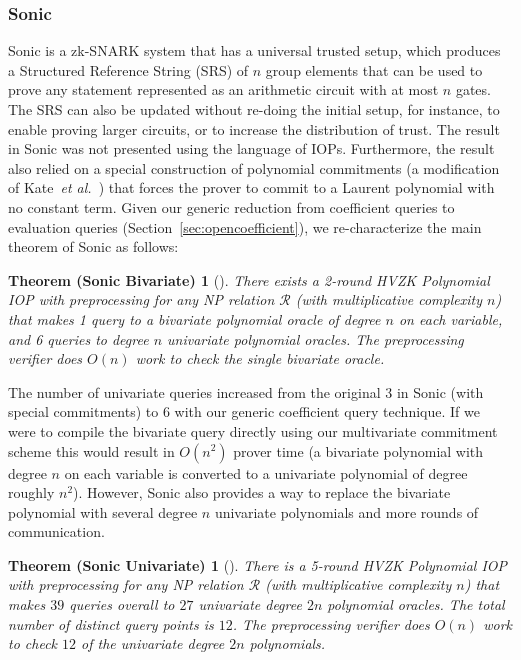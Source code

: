\subsubsection{Sonic} 
\textsf{Sonic} is a zk-SNARK system that has a universal trusted setup, which produces a Structured Reference String (SRS) of $n$ group elements that can be used to prove any statement represented as an arithmetic circuit with at most $n$ gates. The SRS can also be updated without re-doing the initial setup, for instance, to enable proving larger circuits, or to increase the distribution of trust. The result in \textsf{Sonic} was not presented using the language of IOPs. Furthermore, the result also relied on a special construction of polynomial commitments (a modification of Kate~\emph{et al.}~\cite{AC:KatZavGol10}) that forces the prover to commit to a Laurent polynomial with no constant term. Given our generic reduction from coefficient queries to evaluation queries (Section~\ref{sec:opencoefficient}), we re-characterize the main theorem of \textsf{Sonic} as follows: 
\newtheorem*{sonictheorem}{Theorem (Sonic Bivariate)}
\begin{sonictheorem}[\cite{Sonic}]
There exists a 2-round HVZK Polynomial IOP with preprocessing for any NP relation $\mathcal{R}$ (with multiplicative complexity $n$) that makes 1 query to a bivariate polynomial oracle of degree $n$ on each variable, and 6 queries to degree $n$ univariate polynomial oracles. The preprocessing verifier does $O(n)$ work to check the single bivariate oracle. 
\end{sonictheorem}

The number of univariate queries increased from the original $3$ in \textsf{Sonic} (with special commitments) to $6$ with our generic coefficient query technique. If we were to compile the bivariate query directly using our multivariate commitment scheme this would result in $O(n^2)$ prover time (a bivariate polynomial with degree $n$ on each variable is converted to a univariate polynomial of degree roughly $n^2$). However, \textsf{Sonic} also provides a way to replace the bivariate polynomial with several degree $n$ univariate polynomials and more rounds of communication. 

\newtheorem*{sonictheoremuni}{Theorem (Sonic Univariate)}
\begin{sonictheoremuni}[\cite{Sonic}]\label{thm:sonic} 
There is a 5-round HVZK Polynomial IOP with preprocessing for any NP relation $\mathcal{R}$ (with multiplicative complexity $n$) that makes $39$ queries overall to $27$ univariate degree $2n$ polynomial oracles. The total number of distinct query points is $12$. The preprocessing verifier does $O(n)$ work to check $12$ of the univariate degree $2n$ polynomials. 
\end{sonictheoremuni}

